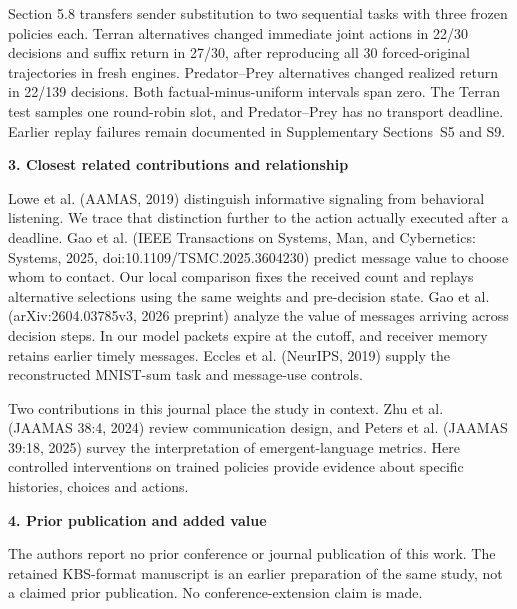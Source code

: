 \documentclass[11pt,a4paper]{article}
\begin{document}
Section 5.8 transfers sender substitution to two sequential tasks with three frozen policies each. Terran alternatives changed immediate joint actions in 22/30 decisions and suffix return in 27/30, after reproducing all 30 forced-original trajectories in fresh engines. Predator--Prey alternatives changed realized return in 22/139 decisions. Both factual-minus-uniform intervals span zero. The Terran test samples one round-robin slot, and Predator--Prey has no transport deadline. Earlier replay failures remain documented in Supplementary Sections~S5 and S9.

\textbf{3. Closest related contributions and relationship}

Lowe et al. (AAMAS, 2019) distinguish informative signaling from behavioral listening. We trace that distinction further to the action actually executed after a deadline. Gao et al. (IEEE Transactions on Systems, Man, and Cybernetics: Systems, 2025, doi:10.1109/TSMC.2025.3604230) predict message value to choose whom to contact. Our local comparison fixes the received count and replays alternative selections using the same weights and pre-decision state. Gao et al. (arXiv:2604.03785v3, 2026 preprint) analyze the value of messages arriving across decision steps. In our model packets expire at the cutoff, and receiver memory retains earlier timely messages. Eccles et al. (NeurIPS, 2019) supply the reconstructed MNIST-sum task and message-use controls.

Two contributions in this journal place the study in context. Zhu et al. (JAAMAS 38:4, 2024) review communication design, and Peters et al. (JAAMAS 39:18, 2025) survey the interpretation of emergent-language metrics. Here controlled interventions on trained policies provide evidence about specific histories, choices and actions.

\textbf{4. Prior publication and added value}

The authors report no prior conference or journal publication of this work. The retained KBS-format manuscript is an earlier preparation of the same study, not a claimed prior publication. No conference-extension claim is made.
\end{document}
